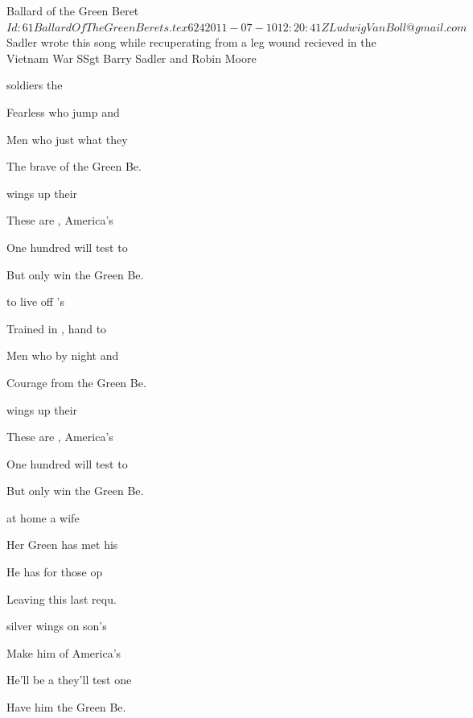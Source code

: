 \begin{SBSong}{Ballard of the Green Beret}
  {$Id: 61BallardOfTheGreenBerets.tex 624 2011-07-10 12:20:41Z LudwigVanBoll@gmail.com $}
  {Sadler wrote this song while recuperating from a leg wound recieved in the Vietnam War}
  {SSgt Barry Sadler and Robin Moore}
  \begin{SBVerse}
	 soldiers  the 
 
	Fearless  who jump and 
	
	Men who  just what they 
	
	The brave  of the Green Be.
  \end{SBVerse}
  \begin{SBVerse}
	 wings up their 
	
	These are , America's 
	
	One hundred  will test to 
	
	But only  win the Green Be.
  \end{SBVerse}
  \begin{SBVerse}
	 to live off 's  
	
	Trained in , hand to  
	
	Men who  by night and  
	
	Courage  from the Green Be.
  \end{SBVerse}
  \begin{SBVerse}
	 wings up their 
	
	These are , America's 
	
	One hundred  will test to
 
	But only  win the Green Be.
  \end{SBVerse}
  \begin{SBVerse}
	 at home a  wife 
	
	Her Green  has met his  
	
	He has  for those op 
	
	Leaving  this last requ. 
  \end{SBVerse}
  \begin{SBVerse}
	 silver wings on  son's  
	
	Make him  of America's  
	
	He'll be a  they'll test one  
	
	Have him  the Green Be.  
  \end{SBVerse}
\end{SBSong}
